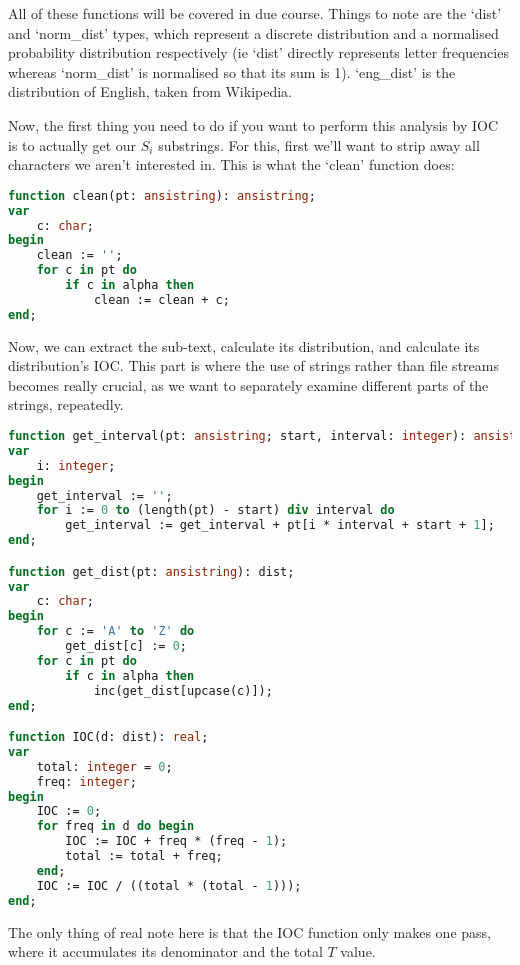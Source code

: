 \documentclass[fleqn,a4paper,11pt]{article}
\begin{document}
    All of these functions will be covered in due course. Things to note are
    the `dist' and `norm\_dist' types, which represent a discrete distribution
    and a normalised probability distribution respectively (ie `dist' directly
    represents letter frequencies whereas `norm\_dist' is normalised so that
    its sum is 1). `eng\_dist' is the distribution of English, taken from
    Wikipedia.

    Now, the first thing you need to do if you want to perform this analysis by
    IOC is to actually get our \(S_i\) substrings. For this, first we'll want to
    strip away all characters we aren't interested in. This is what the `clean'
    function does:

\begin{lstlisting}[language=Pascal, caption=Clean function]
function clean(pt: ansistring): ansistring;
var
    c: char;
begin
    clean := '';
    for c in pt do
        if c in alpha then
            clean := clean + c;
end;
\end{lstlisting}

    Now, we can extract the sub-text, calculate its distribution, and calculate
    its distribution's IOC. This part is where the use of strings rather than
    file streams becomes really crucial, as we want to separately examine
    different parts of the strings, repeatedly.

\begin{lstlisting}[language=Pascal, caption=The rest of the owl (IOC functions)]
function get_interval(pt: ansistring; start, interval: integer): ansistring;
var
    i: integer;
begin
    get_interval := '';
    for i := 0 to (length(pt) - start) div interval do
        get_interval := get_interval + pt[i * interval + start + 1];
end;

function get_dist(pt: ansistring): dist;
var
    c: char;
begin
    for c := 'A' to 'Z' do
        get_dist[c] := 0;
    for c in pt do
        if c in alpha then
            inc(get_dist[upcase(c)]);
end;

function IOC(d: dist): real;
var
    total: integer = 0;
    freq: integer;
begin
    IOC := 0;
    for freq in d do begin
        IOC := IOC + freq * (freq - 1);
        total := total + freq;
    end;
    IOC := IOC / ((total * (total - 1)));
end;
\end{lstlisting}

    The only thing of real note here is that the IOC function only makes one
    pass, where it accumulates its denominator and the total \(T\) value.
\end{document}

